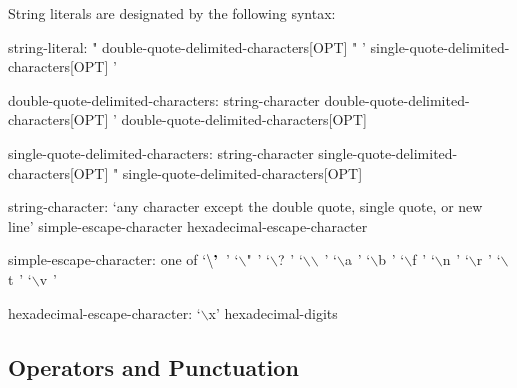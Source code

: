 \pagebreak
String literals are designated by the following syntax:
\begin{syntax}
string-literal:
  " double-quote-delimited-characters[OPT] "
  ' single-quote-delimited-characters[OPT] '

double-quote-delimited-characters:
  string-character double-quote-delimited-characters[OPT]
  ' double-quote-delimited-characters[OPT]

single-quote-delimited-characters:
  string-character single-quote-delimited-characters[OPT]
  " single-quote-delimited-characters[OPT]

string-character:
  `any character except the double quote, single quote, or new line'
  simple-escape-character
  hexadecimal-escape-character

simple-escape-character: one of
  `$\backslash\mbox{\bf '}\hspace{5pt}$' `$\backslash$"$\hspace{5pt}$' `$\backslash$?$\hspace{5pt}$' `$\backslash$$\backslash$$\hspace{5pt}$' `$\backslash$a$\hspace{5pt}$' `$\backslash$b$\hspace{5pt}$' `$\backslash$f$\hspace{5pt}$' `$\backslash$n$\hspace{5pt}$' `$\backslash$r$\hspace{5pt}$' `$\backslash$t$\hspace{5pt}$' `$\backslash$v$\hspace{5pt}$'

hexadecimal-escape-character:
  `$\backslash$x' hexadecimal-digits
\end{syntax}

\subsection{Operators and Punctuation}
\label{Operators_and_Punctuation}

